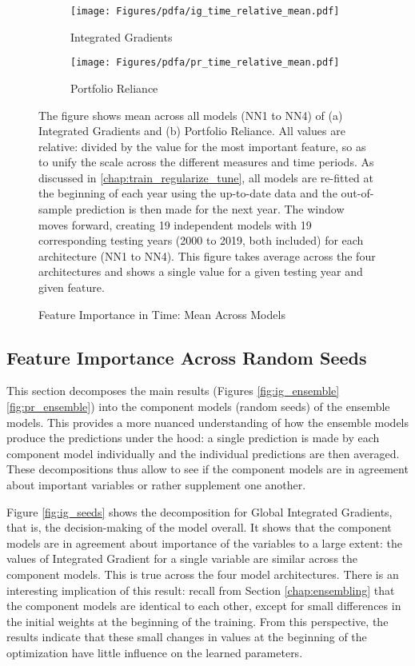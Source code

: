 		\begin{figure}[!htb]	
			\centering		
			\begin{subfigure}[t]{\textwidth}
				\texttt{[image: Figures/pdfa/ig\_time\_relative\_mean.pdf]}
				\caption{Integrated Gradients}
				\label{fig:ig_time_mean}
			\end{subfigure}
			
			\begin{subfigure}[t]{\textwidth}
				\centering
				\texttt{[image: Figures/pdfa/pr\_time\_relative\_mean.pdf]}
				\caption{Portfolio Reliance}
				\label{fig:pr_time_mean}
			\end{subfigure}
			\caption{Feature Importance in Time: Mean Across Models}
			\label{fig:time_mean}
			\medskip
			\small
			The figure shows mean across all models (NN1 to NN4) of (a) Integrated Gradients and (b) Portfolio Reliance. All values are relative: divided by the value for the most important feature, so as to unify the scale across the different measures and time periods. As discussed in \ref{chap:train_regularize_tune}, all models are re-fitted at the beginning of each year using the up-to-date data and the out-of-sample prediction is then made for the next year. The window moves forward, creating 19 independent models with 19 corresponding testing years (2000 to 2019, both included) for each architecture (NN1 to NN4). This figure takes average across the four architectures and shows a single value for a given testing year and given feature. 
		\end{figure}
	
	\subsection{Feature Importance Across Random Seeds}
	
		This section decomposes the main results (Figures \ref{fig:ig_ensemble} \ref{fig:pr_ensemble}) into the component models (random seeds) of the ensemble models. This provides a more nuanced understanding of how the ensemble models produce the predictions under the hood: a single prediction is made by each component model individually and the individual predictions are then averaged. These decompositions thus allow to see if the component models are in agreement about important variables or rather supplement one another. 
		
		Figure \ref{fig:ig_seeds} shows the decomposition for Global Integrated Gradients, that is, the decision-making of the model overall. It shows that the component models are in agreement about importance of the variables to a large extent: the values of Integrated Gradient for a single variable are similar across the component models. This is true across the four model architectures. There is an interesting implication of this result: recall from Section \ref{chap:ensembling} that the component models are identical to each other, except for small differences in the initial weights at the beginning of the training. From this perspective, the results indicate that these small changes in values at the beginning of the optimization have little influence on the learned parameters. 
		

